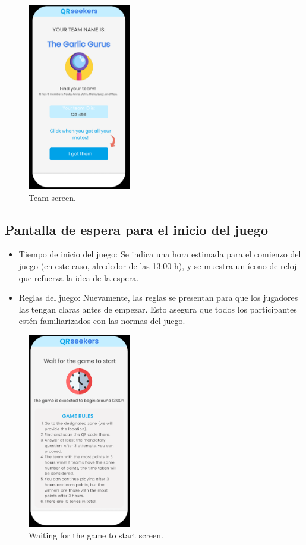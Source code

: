 \documentclass[letterpaper, 12pt]{report}
\begin{document}
\begin{figure}[H]
\centering
\includegraphics[width=0.4\textwidth]{figure6.png}
\caption{Team screen.}
\label{fig:1}
\end{figure}

\subsection{Pantalla de espera para el inicio del juego}

\begin{itemize}
    \item Tiempo de inicio del juego: Se indica una hora estimada para el comienzo del juego (en este caso, alrededor de las 13:00 h), y se muestra un ícono de reloj que refuerza la idea de la espera.
    \item Reglas del juego: Nuevamente, las reglas se presentan para que los jugadores las tengan claras antes de empezar. Esto asegura que todos los participantes estén familiarizados con las normas del juego.
\end{itemize}

\begin{figure}[H]
\centering
\includegraphics[width=0.4\textwidth]{figure7.png}
\caption{Waiting for the game to start screen.}
\label{fig:1}
\end{figure}
\end{document}
